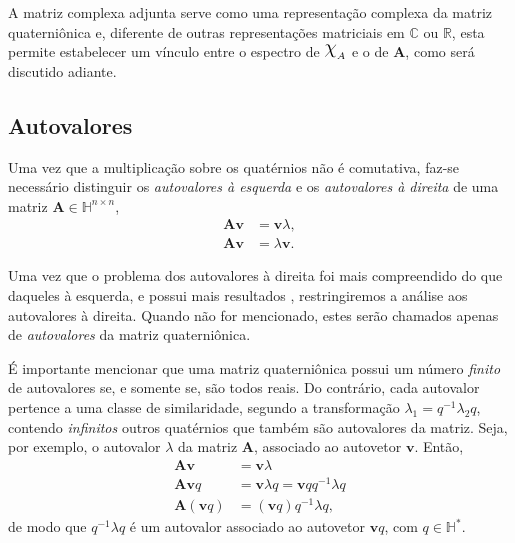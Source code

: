 A matriz complexa adjunta serve como uma representa\c c\~ao complexa da matriz quaterni\^onica e, diferente de outras representa\c c\~oes matriciais em $ \mathbb{C} $ ou $ \mathbb{R} $, esta permite estabelecer um v\'inculo entre o espectro de $ \rchi_{A} $ e o de $ \mathbf{A} $, como ser\'a discutido adiante.

\subsection{Autovalores}

Uma vez que a multiplica\c c\~ao sobre os quat\'ernios n\~ao \'e comutativa, faz-se necess\'ario distinguir os \emph{autovalores \`a esquerda} e os \emph{autovalores \`a direita} de uma matriz $ \mathbf{A} \in \mathbb{H}^{n \times n} $,
\begin{align*}
\mathbf{A} \mathbf{v} &= \mathbf{v} \lambda, \tag{autovalor \`a direita} \\
\mathbf{A} \mathbf{v} &= \lambda \mathbf{v}.  \tag{autovalor \`a esquerda}
\end{align*}

Uma vez que o problema dos autovalores \`a direita foi mais compreendido do que daqueles \`a esquerda, e possui mais resultados \cite[Cap. 5]{zhang1997quaternions}, restringiremos a an\'alise aos autovalores \`a direita. Quando n\~ao for mencionado, estes ser\~ao chamados apenas de \emph{autovalores} da matriz quaterni\^onica.

\'E importante mencionar que uma matriz quaterni\^onica possui um n\'umero \emph{finito} de autovalores se, e somente se, s\~ao todos reais. Do contr\'ario, cada autovalor pertence a uma classe de similaridade, segundo a transforma\c c\~ao $ \lambda_1 = q^{-1} \lambda_2 q $, contendo \emph{infinitos} outros quat\'ernios que tamb\'em s\~ao autovalores da matriz. Seja, por exemplo, o autovalor $ \lambda $ da matriz $ \mathbf{A} $, associado ao autovetor $ \mathbf{v} $. Ent\~ao,
\begin{equation}
\begin{aligned}
\label{eq:similar}
\mathbf{A} \mathbf{v} &= \mathbf{v} \lambda \\
\mathbf{A} \mathbf{v} q &= \mathbf{v} \lambda q = \mathbf{v} q q^{-1} \lambda q \\
\mathbf{A} (\mathbf{v} q) &= (\mathbf{v} q) q^{-1} \lambda q,
\end{aligned}
\end{equation}
de modo que $ q^{-1} \lambda q $ \'e um autovalor associado ao autovetor $ \mathbf{v}q $, com $ q \in \mathbb{H}^\ast $.

